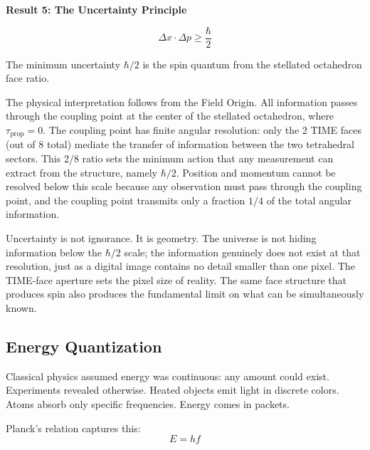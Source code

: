 \documentclass[aps,prd,preprint,superscriptaddress,showpacs,preprintnumbers,amsmath,amssymb,nofootinbib]{revtex4-2}
\begin{document}
\vspace{1.5em}
\noindent
\colorbox{resultgreen}{\parbox{\dimexpr\textwidth-2\fboxsep\relax}{%
\vspace{0.8em}
\centering
\textbf{\large Result 5: The Uncertainty Principle}

\vspace{0.5em}
\boldmath
\begin{equation}
\Delta x \cdot \Delta p \geq \frac{\hbar}{2}
\end{equation}
\unboldmath

\vspace{0.3em}
The minimum uncertainty $\hbar/2$ is the spin quantum from the stellated octahedron face ratio.
\vspace{0.5em}
}}
\vspace{1cm}

The physical interpretation follows from the Field Origin. All information passes through the coupling point at the center of the stellated octahedron, where $\tau_{\text{prop}} = 0$. The coupling point has finite angular resolution: only the 2 TIME faces (out of 8 total) mediate the transfer of information between the two tetrahedral sectors. This 2/8 ratio sets the minimum action that any measurement can extract from the structure, namely $\hbar/2$. Position and momentum cannot be resolved below this scale because any observation must pass through the coupling point, and the coupling point transmits only a fraction $1/4$ of the total angular information.

Uncertainty is not ignorance. It is geometry. The universe is not hiding information below the $\hbar/2$ scale; the information genuinely does not exist at that resolution, just as a digital image contains no detail smaller than one pixel. The TIME-face aperture sets the pixel size of reality. The same face structure that produces spin also produces the fundamental limit on what can be simultaneously known.

\subsection{Energy Quantization}
\label{subsec:quantization}

Classical physics assumed energy was continuous: any amount could exist. Experiments revealed otherwise. Heated objects emit light in discrete colors. Atoms absorb only specific frequencies. Energy comes in packets.

Planck's relation captures this:
\begin{equation}
E = hf
\end{equation}
\end{document}
